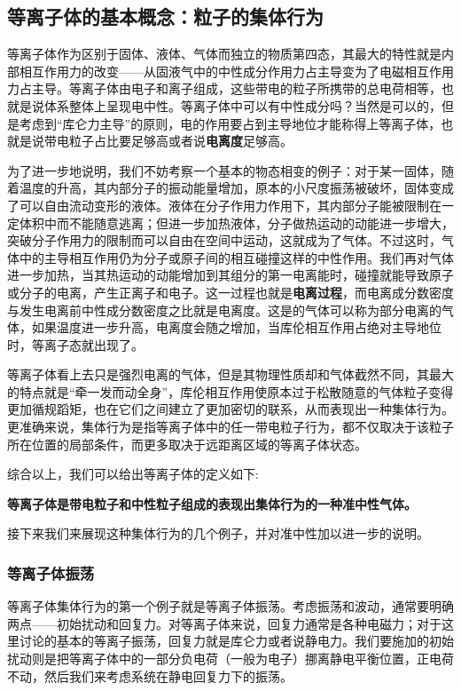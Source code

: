 
\subsection{等离子体的基本概念：粒子的集体行为}

等离子体作为区别于固体、液体、气体而独立的物质第四态，其最大的特性就是内部相互作用力的改变——从固液气中的中性成分作用力占主导变为了电磁相互作用力占主导。等离子体由电子和离子组成，这些带电的粒子所携带的总电荷相等，也就是说体系整体上呈现电中性。等离子体中可以有中性成分吗？当然是可以的，但是考虑到“库仑力主导”的原则，电的作用要占到主导地位才能称得上等离子体，也就是说带电粒子占比要足够高或者说\textbf{电离度}足够高。

为了进一步地说明，我们不妨考察一个基本的物态相变的例子：对于某一固体，随着温度的升高，其内部分子的振动能量增加，原本的小尺度振荡被破坏，固体变成了可以自由流动变形的液体。液体在分子作用力作用下，其内部分子能被限制在一定体积中而不能随意逃离；但进一步加热液体，分子做热运动的动能进一步增大，突破分子作用力的限制而可以自由在空间中运动，这就成为了气体。不过这时，气体中的主导相互作用仍为分子或原子间的相互碰撞这样的中性作用。我们再对气体进一步加热，当其热运动的动能增加到其组分的第一电离能时，碰撞就能导致原子或分子的电离，产生正离子和电子。这一过程也就是\textbf{电离过程}，而电离成分数密度与发生电离前中性成分数密度之比就是电离度。这是的气体可以称为部分电离的气体，如果温度进一步升高，电离度会随之增加，当库伦相互作用占绝对主导地位时，等离子态就出现了。

等离子体看上去只是强烈电离的气体，但是其物理性质却和气体截然不同，其最大的特点就是“牵一发而动全身”，库伦相互作用使原本过于松散随意的气体粒子变得更加循规蹈矩，也在它们之间建立了更加密切的联系，从而表现出一种集体行为。更准确来说，集体行为是指等离子体中的任一带电粒子行为，都不仅取决于该粒子所在位置的局部条件，而更多取决于远距离区域的等离子体状态。

综合以上，我们可以给出等离子体的定义如下:

\textbf{等离子体是带电粒子和中性粒子组成的表现出集体行为的一种准中性气体。}

接下来我们来展现这种集体行为的几个例子，并对准中性加以进一步的说明。

\subsubsection{等离子体振荡}

等离子体集体行为的第一个例子就是等离子体振荡。考虑振荡和波动，通常要明确两点——初始扰动和回复力。对等离子体来说，回复力通常是各种电磁力；对于这里讨论的基本的等离子振荡，回复力就是库仑力或者说静电力。我们要施加的初始扰动则是把等离子体中的一部分负电荷（一般为电子）挪离静电平衡位置，正电荷不动，然后我们来考虑系统在静电回复力下的振荡。

